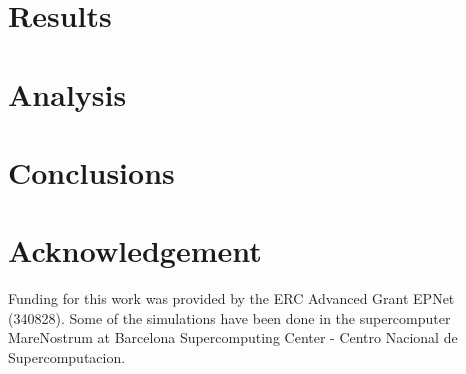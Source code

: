 \documentclass[letterpaper]{article}
\begin{document}
\section{Results}\label{sec:results}


\section{Analysis}


\section{Conclusions}\label{sec:conc}


\section{Acknowledgement}
Funding for this work was provided by the ERC Advanced Grant EPNet (340828).
Some of the simulations have been done in the supercomputer MareNostrum at Barcelona Supercomputing Center - Centro Nacional de Supercomputacion.


\end{document}
